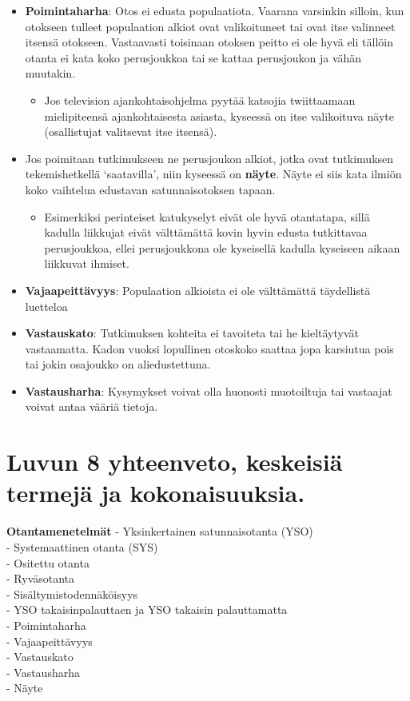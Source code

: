 \documentclass[
]{book}
\providecommand{\tightlist}{%
  \setlength{\itemsep}{0pt}\setlength{\parskip}{0pt}}
\begin{document}
\begin{itemize}
\item
  \textbf{Poimintaharha}: Otos ei edusta populaatiota. Vaarana varsinkin silloin, kun otokseen tulleet populaation alkiot ovat valikoituneet tai ovat itse valinneet itsensä otokseen. Vastaavasti toisinaan otoksen peitto ei ole hyvä eli tällöin otanta ei kata koko perusjoukkoa tai se kattaa perusjoukon ja vähän muutakin.

  \begin{itemize}
  \tightlist
  \item
    Jos television ajankohtaisohjelma pyytää katsojia twiittaamaan mielipiteensä ajankohtaisesta asiasta, kyseessä on itse valikoituva näyte (osallistujat valitsevat itse itsensä).
  \end{itemize}
\item
  Jos poimitaan tutkimukseen ne perusjoukon alkiot, jotka ovat tutkimuksen tekemishetkellä `saatavilla', niin kyseessä on \textbf{näyte}. Näyte ei siis kata ilmiön koko vaihtelua edustavan satunnaisotoksen tapaan.

  \begin{itemize}
  \tightlist
  \item
    Esimerkiksi perinteiset katukyselyt eivät ole hyvä otantatapa, sillä kadulla liikkujat eivät välttämättä kovin hyvin edusta tutkittavaa perusjoukkoa, ellei perusjoukkona ole kyseisellä kadulla kyseiseen aikaan liikkuvat ihmiset.
  \end{itemize}
\item
  \textbf{Vajaapeittävyys}: Populaation alkioista ei ole välttämättä täydellistä luetteloa
\item
  \textbf{Vastauskato}: Tutkimuksen kohteita ei tavoiteta tai he kieltäytyvät vastaamatta. Kadon vuoksi lopullinen otoskoko saattaa jopa karsiutua pois tai jokin osajoukko on aliedustettuna.
\item
  \textbf{Vastausharha}: Kysymykset voivat olla huonosti muotoiltuja tai vastaajat voivat antaa vääriä tietoja.
\end{itemize}

\hypertarget{luvun-8-yhteenveto-keskeisiuxe4-termejuxe4-ja-kokonaisuuksia.}{%
\section{Luvun 8 yhteenveto, keskeisiä termejä ja kokonaisuuksia.}\label{luvun-8-yhteenveto-keskeisiuxe4-termejuxe4-ja-kokonaisuuksia.}}

\textbf{Otantamenetelmät}
- Yksinkertainen satunnaisotanta (YSO)\\
- Systemaattinen otanta (SYS)\\
- Ositettu otanta\\
- Ryväsotanta\\
- Sisältymistodennäköisyys\\
- YSO takaisinpalauttaen ja YSO takaisin palauttamatta\\
- Poimintaharha\\
- Vajaapeittävyys\\
- Vastauskato\\
- Vastausharha\\
- Näyte
\end{document}

